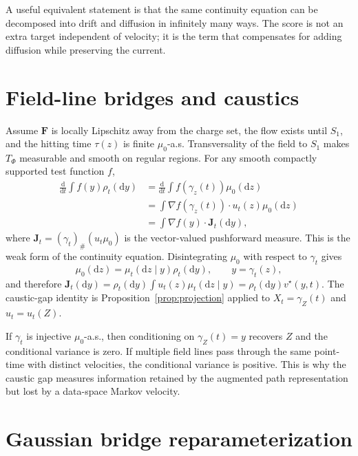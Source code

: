 \documentclass{article}
\numberwithin{equation}{section}
\newcommand{\dd}{\mathrm{d}}
\newcommand{\F}{\bm F}
\newcommand{\J}{\bm J}
\begin{document}
A useful equivalent statement is that the same continuity equation can be decomposed into drift and diffusion in infinitely many ways. The score is not an extra target independent of velocity; it is the term that compensates for adding diffusion while preserving the current.

\section{Field-line bridges and caustics}
\label{app:caustic}

Assume $\F$ is locally Lipschitz away from the charge set, the flow exists until $S_1$, and the hitting time $\tau(z)$ is finite $\mu_0$-a.s. Transversality of the field to $S_1$ makes $T_\Phi$ measurable and smooth on regular regions. For any smooth compactly supported test function $f$,
\begin{align}
\frac{\dd}{\dd t}\int f(y)\rho_t(\dd y)
&=\frac{\dd}{\dd t}\int f(\gamma_z(t))\mu_0(\dd z)\\
&=\int \nabla f(\gamma_z(t))\cdot u_t(z)\mu_0(\dd z)\\
&=\int \nabla f(y)\cdot \J_t(\dd y),
\end{align}
where $\J_t=(\gamma_t)_\#(u_t\mu_0)$ is the vector-valued pushforward measure. This is the weak form of the continuity equation. Disintegrating $\mu_0$ with respect to $\gamma_t$ gives
\begin{equation}
\mu_0(\dd z)=\mu_t(\dd z\mid y)\rho_t(\dd y),\qquad y=\gamma_t(z),
\end{equation}
and therefore $\J_t(\dd y)=\rho_t(\dd y)\int u_t(z)\mu_t(\dd z\mid y)=\rho_t(\dd y)v^\star(y,t)$. The caustic-gap identity is Proposition~\ref{prop:projection} applied to $X_t=\gamma_Z(t)$ and $u_t=u_t(Z)$.

If $\gamma_t$ is injective $\mu_0$-a.s., then conditioning on $\gamma_Z(t)=y$ recovers $Z$ and the conditional variance is zero. If multiple field lines pass through the same point-time with distinct velocities, the conditional variance is positive. This is why the caustic gap measures information retained by the augmented path representation but lost by a data-space Markov velocity.

\section{Gaussian bridge reparameterization}
\label{app:gaussian}
\end{document}
